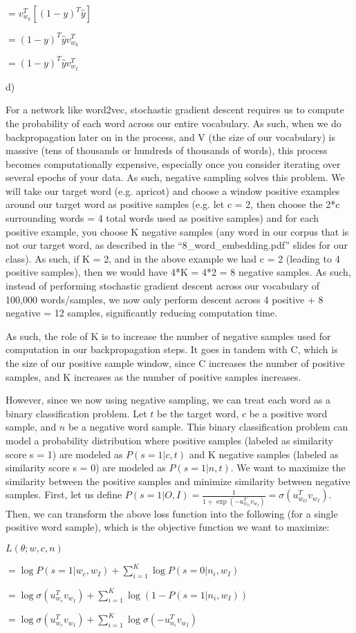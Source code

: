 \begin{solution}
$= v_{w_k}^T \left[(1 - y)^T \hat{y} \right]$

$= (1 - y)^T \hat{y} v_{w_k}^T$

$= (1 - y)^T \hat{y} v_{w_I}^T$

d)

For a network like word2vec, stochastic gradient descent requires us to compute the probability of each word across our entire vocabulary. As such, when we do backpropagation later on in the process, and V (the size of our vocabulary) is massive (tens of thousands or hundreds of thousands of words), this process becomes computationally expensive, especially once you consider iterating over several epochs of your data. As such, negative sampling solves this problem. We will take our target word (e.g. apricot) and choose a window positive examples around our target word as positive samples (e.g. let c = 2, then choose the 2*c surrounding words = 4 total words used as positive samples) and for each positive example, you choose K negative samples (any word in our corpus that is not our target word, as described in the ``8\_word\_embedding.pdf'' slides for our class). As such, if K = 2, and in the above example we had c = 2 (leading to 4 positive samples), then we would have 4*K = 4*2 = 8 negative samples. As such, instead of performing stochastic gradient descent across our vocabulary of 100,000 words/samples, we now only perform descent across 4 positive + 8 negative = 12 samples, significantly reducing computation time.

As such, the role of K is to increase the number of negative samples used for computation in our backpropagation steps. It goes in tandem with C, which is the size of our positive sample window, since C increases the number of positive samples, and K increases as the number of positive samples increases. 

However, since we now using negative sampling, we can treat each word as a binary classification problem. Let $t$ be the target word, $c$ be a positive word sample, and $n$ be a negative word sample. This binary classification problem can model a probability distribution where positive samples (labeled as similarity score s = 1) are modeled as $P(s = 1 \vert c, t)$ and K negative samples (labeled as similarity score s = 0) are modeled as $P(s = 1 \vert n, t)$. We want to maximize the similarity between the positive samples and minimize similarity between negative samples. First, let us define $P(s = 1 \vert O, I) = \frac{1}{1 + \exp(-u_{w_O}^T v_{w_I})} = \sigma(u_{w_O}^T v_{w_I})$. Then, we can transform the above loss function into the following (for a single positive word sample), which is the objective function we want to maximize:

$L(\theta; w, c, n)$

$= \log P(s = 1 \vert w_c, w_I) + \sum_{i = 1}^{K} \log P(s = 0 \vert n_i, w_I)$

$= \log \sigma(u_{w_c}^T v_{w_I}) + \sum_{i = 1}^{K} \log(1 - P(s = 1 \vert n_i, w_I))$

$= \log \sigma(u_{w_c}^T v_{w_I}) + \sum_{i = 1}^{K} \log \sigma(-u_{n_i}^T v_{w_I})$

\end{solution}